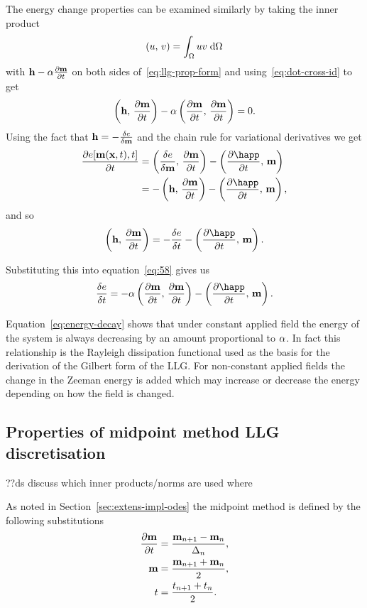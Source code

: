 The energy change properties can be examined similarly by taking the inner product
\begin{equation}
  \left(u,\, v \right) = \int_\Omega u v {\; \text{d}}\Omega
\end{equation}
with $\mathbf{h} - \alpha \frac{\partial \mathbf{m}}{\partial t}$ on both sides of~\eqref{eq:llg-prop-form} and using~\eqref{eq:dot-cross-id} to get
\begin{equation}
  \label{eq:58}
  \left(\mathbf{h},\, \frac{\partial \mathbf{m}}{\partial t} \right) - \alpha \left(\frac{\partial \mathbf{m}}{\partial t},\, \frac{\partial \mathbf{m}}{\partial t} \right) = 0.
\end{equation}
Using the fact that $\mathbf{h} = -\frac{\delta e}{\delta \mathbf{m}}$ and the chain rule for variational derivatives we get \cite{??ds}
\begin{align*}
  \pd{\e[\mv(\xv, t), t]}{t} &= \ip{\vd{e}{\mv}}{\dmdt} - \ip{\pd{\happ}{t}}{\mv} \\
             &= -\ip{\hv}{\dmdt} - \ip{\pd{\happ}{t}}{\mv},
\end{align*}
and so
\begin{equation}
  \ip{\hv}{\dmdt} = -\vd{\e}{t} - \ip{\pd{\happ}{t}}{\mv}.
\end{equation}

Substituting this into equation~\eqref{eq:58} gives us
\begin{equation}
  \label{eq:energy-decay}
  \vd{\e}{t} = -\dampc \ip{\dmdt}{\dmdt} - \ip{\pd{\happ}{t}}{\mv}.
\end{equation}

Equation~\eqref{eq:energy-decay} shows that under constant applied field the energy of the system is always decreasing by an amount proportional to $\alpha$.
In fact this relationship is the Rayleigh dissipation functional used as the basis for the derivation of the Gilbert form of the LLG.\cite{Gilbert2004}
For non-constant applied fields the change in the Zeeman energy is added which may increase or decrease the energy depending on how the field is changed. %


\subsection{Properties of midpoint method LLG discretisation}
\label{sec:prop-midp-meth}

??ds discuss which inner products/norms are used where

As noted in Section~\ref{sec:extens-impl-odes} the midpoint method is defined by the following substitutions
\begin{align}
  \label{eq:55}
  \frac{\partial \mathbf{m}}{\partial t} &= \frac{\mathbf{m}_{n+1} - \mathbf{m}_n}{\Delta_{n}}, \\
  \mathbf{m} &= \frac{\mathbf{m}_{n+1} + \mathbf{m}_n}{2}, \\
  t &=  \frac{t_{n+1} + t_n}{2}.
\end{align}


